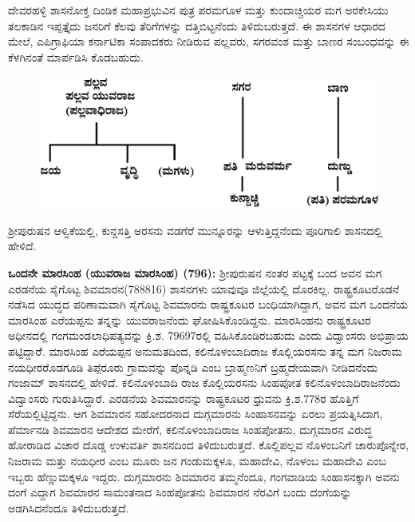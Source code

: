 ದೇವರಹಳ್ಳಿ ಶಾಸನೋಕ್ತ ದಿಂಡಿಕ ಮಹಾಪ್ರಭುವಿನ ಪುತ್ರ ಪರಮಗೂಳ ಮತ್ತು ಕುಂದಾಚ್ಚಿಯರ ಮಗ ಅರಕೇಸಿಯು ತಲಕಾಡಿನ ಇಪ್ಪತ್ತೈದು ಜನರಿಗೆ ಕೆಲವು ತೆರಿಗೆಗಳನ್ನು ದತ್ತಿಬಿಟ್ಟನೆಂದು ತಿಳಿದುಬರುತ್ತದೆ. ಈ ಶಾಸನಗಳ ಆಧಾರದ ಮೇಲೆ, ಎಪಿಗ್ರಾಫಿಯಾ ಕರ್ನಾಟಿಕಾ ಸಂಪಾದಕರು ನೀಡಿರುವ ಪಲ್ಲವರು, ಸಗರವಂಶ ಮತ್ತು ಬಾಣರ ಸಂಬಂಧವನ್ನು ಈ ಕೆಳಗಿನಂತೆ ಮಾರ್ಪಡಿಸಿ ಕೊಡಬಹುದು.

\begin{figure}[!h]
\includegraphics{"images/chap2/1.jpeg"}
\end{figure}

ಶ‍್ರೀಪುರುಷನ ಆಳ್ವಿಕೆಯಲ್ಲಿ, ಕುನ್ದಸತ್ತಿ ಅರಸನು ವಡಗೆರೆ ಮುನ್ನೂರನ್ನು ಆಳುತ್ತಿದ್ದನೆಂದು ಪೂರಿಗಾಲಿ ಶಾಸನದಲ್ಲಿ ಹೇಳಿದೆ.\textbf{ }

\textbf{ ಒಂದನೇ ಮಾರಸಿಂಹ (ಯುವರಾಜ ಮಾರಸಿಂಹ) (796):} ಶ‍್ರೀಪುರುಷನ ನಂತರ ಪಟ್ಟಕ್ಕೆ ಬಂದ ಅವನ ಮಗ ಎರಡನೆಯ ಸೈಗೊಟ್ಟ ಶಿವಮಾರನ(788816) ಶಾಸನಗಳು ಯಾವುವೂ ಜಿಲ್ಲೆಯಲ್ಲಿ ದೊರಕಿಲ್ಲ. ರಾಷ್ಟ್ರಕೂಟರೊಡನೆ ನಡೆಸಿದ ಯುದ್ಧದ ಪರಿಣಾಮವಾಗಿ ಸೈಗೊಟ್ಟ ಶಿವಮಾರನು ರಾಷ್ಟ್ರಕೂಟರ ಬಂಧಿಯಾಗಿದ್ದಾಗ, ಅವನ ಮಗ ಒಂದನೆಯ ಮಾರಸಿಂಹ ಎರೆಯಪ್ಪನು ತನ್ನನ್ನು ಯುವರಾಜನೆಂದು ಘೋಷಿಸಿಕೊಂಡಿದ್ದನು. ಮಾರಸಿಂಹನು ರಾಷ್ಟ್ರಕೂಟರ ಅಧೀನದಲ್ಲಿ ಗಂಗಮಂಡಲಾಧಿಪತ್ಯವನ್ನು ಕ್ರಿ.ಶ. 79697ರಲ್ಲಿ ವಹಿಸಿಕೊಂಡಿರಬಹುದು ಎಂದು ವಿದ್ವಾಂಸರು ಅಭಿಪ್ರಾಯ ಪಟ್ಟಿದ್ದಾರೆೆ. ಮಾರಸಿಂಹ ಎರೆಯಪ್ಪನ ಅನುಮತದಿಂದ, ಕಲಿನೊಳಂಬಾದಿರಾಜ ಕೊಲ್ಲಿಯರಸನು ತನ್ನ ಮಗ ನಿಜರಾಮ ನಯಧೀರರೊಡ\-ಗೂಡಿ ತಿಪ್ಪೆರೂರು ಗ್ರಾಮವನ್ನು ಪೊನ್ನಡಿ ಎಂಬ ಬ್ರಾಹ್ಮಣನಿಗೆ ಬ್ರಹ್ಮದೇಯವಾಗಿ ನೀಡಿದನೆಂದು ಗಂಜಾಮ್ ಶಾಸನದಲ್ಲಿ ಹೇಳಿದೆ. ಕಲಿನೊಳಂಬಾದಿ ರಾಜ ಕೊಲ್ಲಿಯರಸನು ಸಿಂಹಪೋತ ಕಲಿನೊಳಂಬಾದಿರಾಜನೆಂದು ವಿದ್ವಾಂಸರು ಗುರುತಿಸಿದ್ದಾರೆ. ಎರಡನೆಯ ಶಿವಮಾರನನ್ನು ರಾಷ್ಟ್ರಕೂಟರ ಧ್ರುವನು ಕ್ರಿ.ಶ.778ರ ಹೊತ್ತಿಗೆ ಸೆರೆಯಲ್ಲಿಟ್ಟಿದ್ದನು. ಆಗ ಶಿವಮಾರನ ಸಹೋದರನಾದ ದುಗ್ಗಮಾರನು ಸಿಂಹಾಸನವನ್ನು ಏರಲು ಪ್ರಯತ್ನಿಸಿದಾಗ, ಪೆರ್ಮಾನಡಿ ಶಿವಮಾರನ ಆದೇಶದ ಮೇರೆಗೆ, ಕಲಿನೊಳಂಬಾದಿರಾಜ ಸಿಂಹಪೋತನು, ದುಗ್ಗಮಾರನ ವಿರುದ್ಧ ಹೋರಾಡಿದ ವಿಚಾರ ದೊಡ್ಡ ಉಳುವರ್ತಿ ಶಾಸನದಿಂದ ತಿಳಿದುಬರುತ್ತದೆ. ಕೊಲ್ಲಿಪಲ್ಲವ ನೊಳಂಬನಿಗೆ ಚಾರುಪೊನ್ನೇರ, ನಿಜರಾಮ ಮತ್ತು ನಯಧೀರ ಎಂಬ ಮೂರು ಜನ ಗಂಡುಮಕ್ಕಳೂ, ಮಹಾದೇವಿ, ನೊಳಂಬ ಮಹಾದೇವಿ ಎಂಬ ಇಬ್ಬರು ಹೆಣ್ಣುಮಕ್ಕಳೂ ಇದ್ದರು. ದುಗ್ಗಮಾರನು ಶಿವಮಾರನ ತಮ್ಮನೆಂದೂ, ಗಂಗವಾಡಿಯ ಸಿಂಹಾಸನಕ್ಕಾಗಿ ಅವನು ದಂಗೆ ಎದ್ದಾಗ ಶಿವಮಾರನ ಸಾಮಂತನಾದ ಸಿಂಹಪೋತನು ಶಿವಮಾರನ ನೆರವಿಗೆ ಬಂದು ದಂಗೆಯನ್ನು ಅಡಗಿಸಿದನೆಂದೂ ತಿಳಿದುಬರುತ್ತದೆ.

